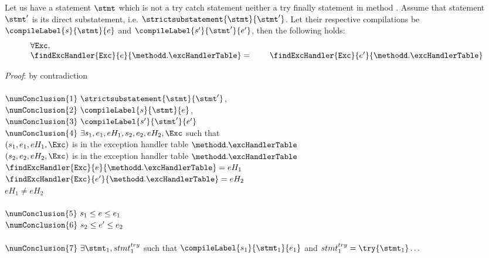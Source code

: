 \begin{compProp8A}
  Let us have a statement $\stmt$ which is not a try catch statement  neither a try finally statement in method \methodd. Assume that 
  statement $\stmt'$ is its direct substatement, i.e. 
$\strictsubstatement{\stmt}{\stmt'} $. Let 
 their respective compilations be  $\compileLabel{s}{\stmt}{e}$ and  $\compileLabel{s'}{\stmt'}{e'}$, then the following holds:
$$ \begin{array}{l}
          \forall \mbox{\rm\tt{Exc}}, \\
	  \findExcHandler{\mbox{\rm\tt{Exc}} }{e}{\methodd.\excHandlerTable} = 
	  \phantom{\forall \mbox{\rm\tt{Exc}} }\findExcHandler{\mbox{\rm\tt{Exc}} }{e'}{\methodd.\excHandlerTable} 
   \end{array}
$$
\end{compProp8A}
\textit{Proof}: by contradiction \\
 \\
$\numConclusion{1} \ \strictsubstatement{\stmt}{\stmt'}   $, \\
$\numConclusion{2} \ \compileLabel{s}{\stmt}{e}$,\\
$\numConclusion{3} \ \compileLabel{s'}{\stmt'}{e'}$ \\
$\numConclusion{4} \ \exists s_1, e_1, eH_1, s_2, e_2, eH_2, \Exc $ such that\\
   $ (s_1,e_1, eH_1, \Exc )$ is in the exception handler table $\methodd.\excHandlerTable$\\
   $ (s_2,e_2, eH_2, \Exc )$ is in the exception handler table $\methodd.\excHandlerTable$\\
   $\findExcHandler{\mbox{\rm\tt{Exc}} }{e}{\methodd.\excHandlerTable} = eH_1$  \\
   $\findExcHandler{\mbox{\rm\tt{Exc}} }{e'}{\methodd.\excHandlerTable} = eH_2$  \\
   $ eH_1 \neq  eH_2  $ \\
 \\
$\numConclusion{5} \  s_1 \le e \le e_1$ \\
$\numConclusion{6} \  s_2 \le e' \le e_2$ \\
 \\
$\numConclusion{7} \ \exists \stmt_1, stmt^{try}_1 $ such that $  \compileLabel{s_1}{\stmt_1}{e_1}$ and $  stmt^{try}_1 = \try\{ \stmt_1\} \ldots $ \\
